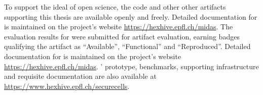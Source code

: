 To support the ideal of open science, the code and other other artifacts
supporting this thesis are available openly and freely.
Detailed documentation for \midas is maintained on the project's website
\url{https://hexhive.epfl.ch/midas}.
The evaluation results for \midas were submitted for artifact evaluation,
earning badges qualifying the artifact as ``Available'', ``Functional''
and ``Reproduced''.
Detailed documentation for \midas is maintained on the project's website
\url{https://hexhive.epfl.ch/midas}.
\seccells{}' prototype, benchmarks, supporting infrastructure and
requisite documentation are also available at 
\url{https://www.hexhive.epfl.ch/securecells}.


